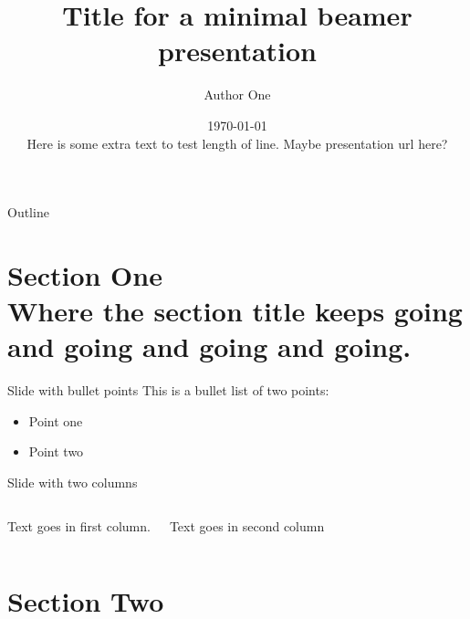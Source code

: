 \documentclass[aspectratio=169, 12pt]{beamer} %
\title{Title for a minimal beamer presentation} %
\author{Author One}               %
\institute{Name of department/affiliation}         %
\date{\today\\
Here is some extra text to test length of line. Maybe presentation url here?}                 %
\begin{document}

\maketitle

  

\begin{frame}{Outline}
  \tableofcontents
\end{frame}

%

\section{Section One\\Where the section title keeps going and going and going and going.}

\begin{frame}{Slide with bullet points}
  This is a bullet list of two points:
    \begin{itemize}
    \item Point one
        \item Point two
  \end{itemize}
\end{frame}

\begin{frame}{Slide with two columns}
  \begin{columns}
        Text goes in first column.
        
        Text goes in second column
  \end{columns}
\end{frame}

\section{Section Two}
\end{document}

